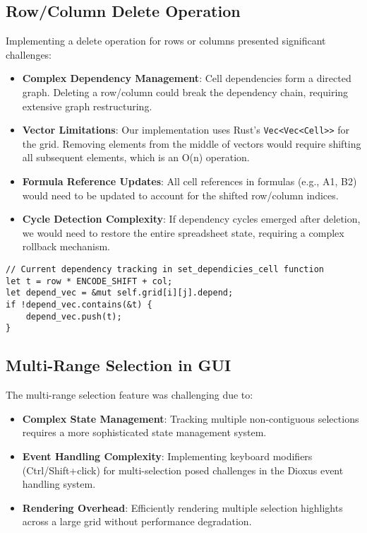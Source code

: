 \documentclass[12pt]{article}
\begin{document}
\subsection{Row/Column Delete Operation}
Implementing a delete operation for rows or columns presented significant challenges:
\begin{itemize}
    \item \textbf{Complex Dependency Management}: Cell dependencies form a directed graph. Deleting a row/column could break the dependency chain, requiring extensive graph restructuring.
    \item \textbf{Vector Limitations}: Our implementation uses Rust's \texttt{Vec<Vec<Cell>>} for the grid. Removing elements from the middle of vectors would require shifting all subsequent elements, which is an O(n) operation.
    \item \textbf{Formula Reference Updates}: All cell references in formulas (e.g., A1, B2) would need to be updated to account for the shifted row/column indices.
    \item \textbf{Cycle Detection Complexity}: If dependency cycles emerged after deletion, we would need to restore the entire spreadsheet state, requiring a complex rollback mechanism.
\end{itemize}

\begin{lstlisting}[caption={Current dependency tracking mechanism}]
// Current dependency tracking in set_dependicies_cell function
let t = row * ENCODE_SHIFT + col;
let depend_vec = &mut self.grid[i][j].depend;
if !depend_vec.contains(&t) {
    depend_vec.push(t);
}
\end{lstlisting}

\subsection{Multi-Range Selection in GUI}
The multi-range selection feature was challenging due to:
\begin{itemize}
    \item \textbf{Complex State Management}: Tracking multiple non-contiguous selections requires a more sophisticated state management system.
    \item \textbf{Event Handling Complexity}: Implementing keyboard modifiers (Ctrl/Shift+click) for multi-selection posed challenges in the Dioxus event handling system.
    \item \textbf{Rendering Overhead}: Efficiently rendering multiple selection highlights across a large grid without performance degradation.
\end{itemize}
\end{document}
